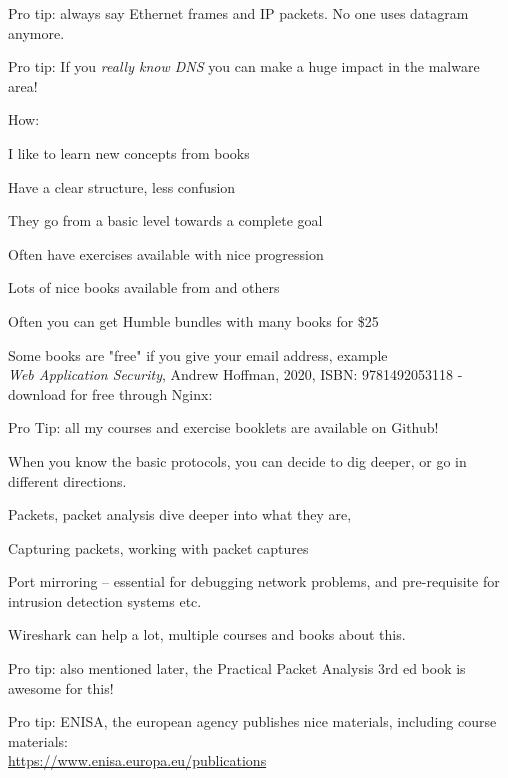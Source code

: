\documentclass[Screen16to9,17pt]{foils}
\begin{document}
Pro tip: always say Ethernet frames and IP packets. No one uses datagram anymore.

Pro tip: If you \emph{really know DNS} you can make a huge impact in the malware area!




How:

I like to learn new concepts from books
\begin{list2}
\item Have a clear structure, less confusion
\item They go from a basic level towards a complete goal
\item Often have exercises available with nice progression
\item Lots of nice books available from  and others
\item Often you can get Humble bundles with many books for \$25
\item Some books are "free" if you give your email address, example\\
\emph{Web Application Security}, Andrew Hoffman, 2020, ISBN: 9781492053118 - download for free through Nginx:\\
\end{list2}

Pro Tip: all my courses and exercise booklets are available on Github!


When you know the basic protocols, you can decide to dig deeper, or go in different directions.

\begin{list2}
\item Packets, packet analysis dive deeper into what they are,
\item Capturing packets, working with packet captures
\item Port mirroring -- essential for debugging network problems, and pre-requisite for intrusion detection systems etc.
\end{list2}

Wireshark can help a lot, multiple courses and books about this.

Pro tip: also mentioned later, the Practical Packet Analysis 3rd ed book is awesome for this!

Pro tip: ENISA, the european agency publishes nice materials, including course materials:\\
\url{https://www.enisa.europa.eu/publications}
\end{document}

